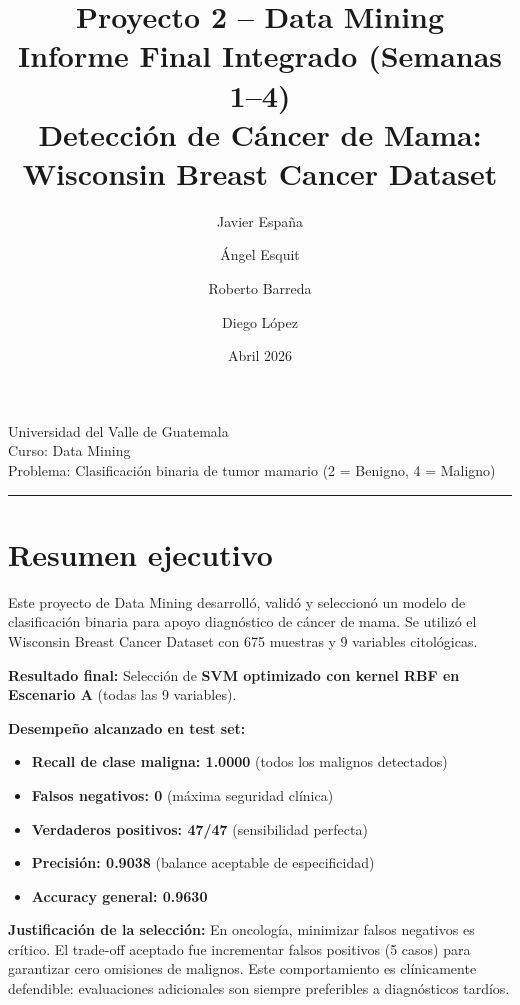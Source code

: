 \documentclass[11pt,a4paper]{article}
\title{\textbf{Proyecto 2 -- Data Mining}\\[0.4em]
       \large Informe Final Integrado (Semanas 1--4)\\[0.2em]
       \normalsize Detección de Cáncer de Mama: Wisconsin Breast Cancer Dataset}
\author{Javier España \and Ángel Esquit \and Roberto Barreda \and Diego López}
\date{Abril 2026}
\begin{document}
\maketitle
\thispagestyle{empty}

\begin{center}
\large Universidad del Valle de Guatemala\\[0.2em]
\normalsize Curso: Data Mining\\[0.2em]
Problema: Clasificación binaria de tumor mamario (2 = Benigno, 4 = Maligno)
\end{center}

\vspace{0.5em}\hrule\vspace{1em}

\tableofcontents
\newpage

\section{Resumen ejecutivo}

Este proyecto de Data Mining desarrolló, validó y seleccionó un modelo de clasificación binaria para apoyo diagnóstico de cáncer de mama. Se utilizó el Wisconsin Breast Cancer Dataset con 675 muestras y 9 variables citológicas.

\textbf{Resultado final:} Selección de \textbf{SVM optimizado con kernel RBF en Escenario A} (todas las 9 variables).

\textbf{Desempeño alcanzado en test set:}
\begin{itemize}[leftmargin=1.4cm]
\item \textbf{Recall de clase maligna: 1.0000} (todos los malignos detectados)
\item \textbf{Falsos negativos: 0} (máxima seguridad clínica)
\item \textbf{Verdaderos positivos: 47/47} (sensibilidad perfecta)
\item \textbf{Precisión: 0.9038} (balance aceptable de especificidad)
\item \textbf{Accuracy general: 0.9630}
\end{itemize}

\textbf{Justificación de la selección:} En oncología, minimizar falsos negativos es crítico. El trade-off aceptado fue incrementar falsos positivos (5 casos) para garantizar cero omisiones de malignos. Este comportamiento es clínicamente defendible: evaluaciones adicionales son siempre preferibles a diagnósticos tardíos.
\end{document}
